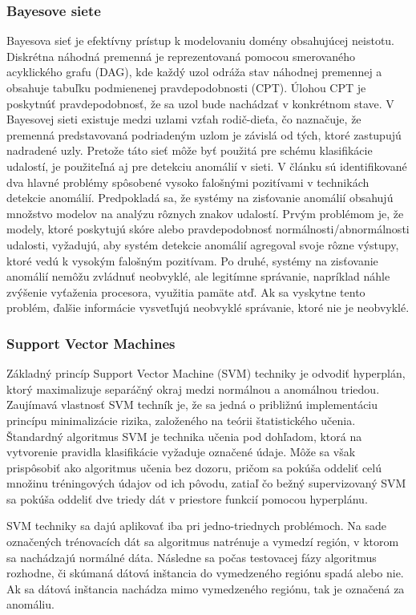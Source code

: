 \subsubsection{Bayesove siete}
Bayesova sieť je efektívny prístup k modelovaniu domény obsahujúcej neistotu. Diskrétna náhodná premenná je reprezentovaná pomocou smerovaného acyklického grafu (DAG), kde každý uzol odráža stav náhodnej premennej a obsahuje tabuľku podmienenej pravdepodobnosti (CPT). Úlohou CPT je poskytnúť pravdepodobnosť, že sa uzol bude nachádzať v konkrétnom stave. V Bayesovej sieti existuje medzi uzlami vzťah rodič-dieťa, čo naznačuje, že premenná predstavovaná podriadeným uzlom je závislá od tých, ktoré zastupujú nadradené uzly. Pretože táto sieť môže byť použitá pre schému klasifikácie udalostí, je použiteľná aj pre detekciu anomálií v sieti. V článku\cite{kruegel2003} sú identifikované dva hlavné problémy spôsobené vysoko falošnými pozitívami v technikách detekcie anomálií. Predpokladá sa, že systémy na zisťovanie anomálií obsahujú množstvo modelov na analýzu rôznych znakov udalostí. Prvým problémom je, že modely, ktoré poskytujú skóre alebo pravdepodobnosť normálnosti/abnormálnosti udalosti, vyžadujú, aby systém detekcie anomálií agregoval svoje rôzne výstupy, ktoré vedú k vysokým falošným pozitívam. Po druhé, systémy na zisťovanie anomálií nemôžu zvládnuť neobvyklé, ale legitímne správanie, napríklad náhle zvýšenie vyťaženia procesora, využitia pamäte atď. Ak sa vyskytne tento problém, ďalšie informácie vysvetľujú neobvyklé správanie, ktoré nie je neobvyklé.\cite{ahmed}

\subsubsection{Support Vector Machines}
Základný princíp Support Vector Machine (SVM) techniky je odvodiť hyperplán, ktorý maximalizuje separáčný okraj medzi normálnou a anomálnou triedou.\cite{eskin2002} Zaujímavá vlastnosť SVM techník je, že sa jedná o približnú implementáciu princípu minimalizácie rizika, založeného na teórii štatistického učenia. Štandardný algoritmus SVM je technika učenia pod dohľadom, ktorá na vytvorenie pravidla klasifikácie vyžaduje označené údaje. Môže sa však prispôsobiť ako algoritmus učenia bez dozoru, pričom sa pokúša oddeliť celú množinu tréningových údajov od ich pôvodu, zatiaľ čo bežný supervizovaný SVM sa pokúša oddeliť dve triedy dát v priestore funkcií pomocou hyperplánu.\cite{ahmed}\par

SVM techniky sa dajú aplikovať iba pri jedno-triednych  problémoch. Na sade označených trénovacích dát sa algoritmus natrénuje a vymedzí región, v ktorom sa
nachádzajú normálné dáta. Následne sa počas testovacej fázy algoritmus rozhodne, či skúmaná dátová inštancia do vymedzeného regiónu spadá alebo nie. Ak sa dátová inštancia nachádza
mimo vymedzeného regiónu, tak je označená za anomáliu.\cite{Chandola}
